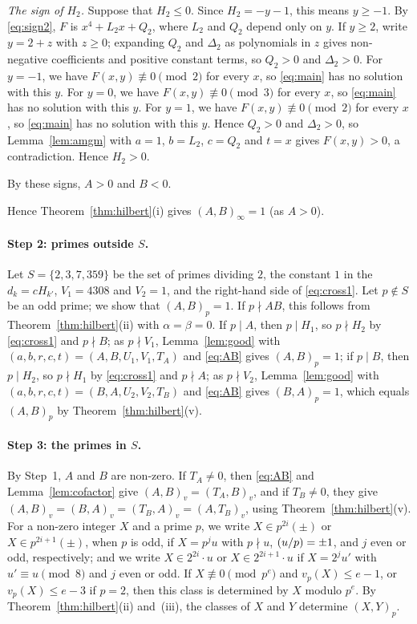 \documentclass[11pt]{article}
\newcommand{\leg}[2]{\mathchoice{\biggl(\dfrac{#1}{#2}\biggr)}{(#1/#2)}{(#1/#2)}{(#1/#2)}}
\begin{document}
\emph{The sign of $H_{2}$.} Suppose that $H_{2}\leq0$. Since $H_{2}=-y-1$, this means $y\geq-1$. By \eqref{eq:sign2}, $F$ is $x^4+L_{2}x+Q_{2}$, where $L_{2}$ and $Q_{2}$ depend only on $y$. If $y\geq2$, write $y=2+z$ with $z\geq0$; expanding $Q_{2}$ and $\Delta_{2}$ as polynomials in $z$ gives non-negative coefficients and positive constant terms, so $Q_{2}>0$ and $\Delta_{2}>0$. For $y=-1$, we have $F(x,y)\not\equiv0\pmod{2}$ for every $x$, so \eqref{eq:main} has no solution with this $y$. For $y=0$, we have $F(x,y)\not\equiv0\pmod{3}$ for every $x$, so \eqref{eq:main} has no solution with this $y$. For $y=1$, we have $F(x,y)\not\equiv0\pmod{2}$ for every $x$, so \eqref{eq:main} has no solution with this $y$. Hence $Q_{2}>0$ and $\Delta_{2}>0$, so Lemma~\ref{lem:amgm} with $a=1$, $b=L_{2}$, $c=Q_{2}$ and $t=x$ gives $F(x,y)>0$, a contradiction. Hence $H_{2}>0$.

By these signs, $A>0$ and $B<0$.

Hence Theorem~\ref{thm:hilbert}(i) gives $(A,B)_\infty=1$ (as $A>0$).

\paragraph{Step 2: primes outside $S$.} Let $S=\{2,3,7,359\}$ be the set of primes dividing $2$, the constant $1$ in the $d_k=cH_{k'}$, $V_{1}=4308$ and $V_{2}=1$, and the right-hand side of \eqref{eq:cross1}. Let $p\notin S$ be an odd prime; we show that $(A,B)_p=1$. If $p\nmid AB$, this follows from Theorem~\ref{thm:hilbert}(ii) with $\alpha=\beta=0$. If $p\mid A$, then $p\mid H_{1}$, so $p\nmid H_{2}$ by \eqref{eq:cross1} and $p\nmid B$; as $p\nmid V_{1}$, Lemma~\ref{lem:good} with $(a,b,r,c,t)=(A,B,U_{1},V_{1},T_A)$ and \eqref{eq:AB} gives $(A,B)_p=1$; if $p\mid B$, then $p\mid H_{2}$, so $p\nmid H_{1}$ by \eqref{eq:cross1} and $p\nmid A$; as $p\nmid V_{2}$, Lemma~\ref{lem:good} with $(a,b,r,c,t)=(B,A,U_{2},V_{2},T_B)$ and \eqref{eq:AB} gives $(B,A)_p=1$, which equals $(A,B)_p$ by Theorem~\ref{thm:hilbert}(v).

\paragraph{Step 3: the primes in $S$.} By Step~1, $A$ and $B$ are non-zero. If $T_A\neq0$, then \eqref{eq:AB} and Lemma~\ref{lem:cofactor} give $(A,B)_v=(T_A,B)_v$, and if $T_B\neq0$, they give $(A,B)_v=(B,A)_v=(T_B,A)_v=(A,T_B)_v$, using Theorem~\ref{thm:hilbert}(v). For a non-zero integer $X$ and a prime $p$, we write $X\in p^{2i}(\pm)$ or $X\in p^{2i+1}(\pm)$, when $p$ is odd, if $X=p^ju$ with $p\nmid u$, $\leg{u}{p}=\pm1$, and $j$ even or odd, respectively; and we write $X\in2^{2i}\cdot u$ or $X\in2^{2i+1}\cdot u$ if $X=2^ju'$ with $u'\equiv u\pmod 8$ and $j$ even or odd. If $X\not\equiv0\pmod{p^e}$ and $v_p(X)\leq e-1$, or $v_p(X)\leq e-3$ if $p=2$, then this class is determined by $X$ modulo $p^e$. By Theorem~\ref{thm:hilbert}(ii) and~(iii), the classes of $X$ and $Y$ determine $(X,Y)_p$.
\end{document}
